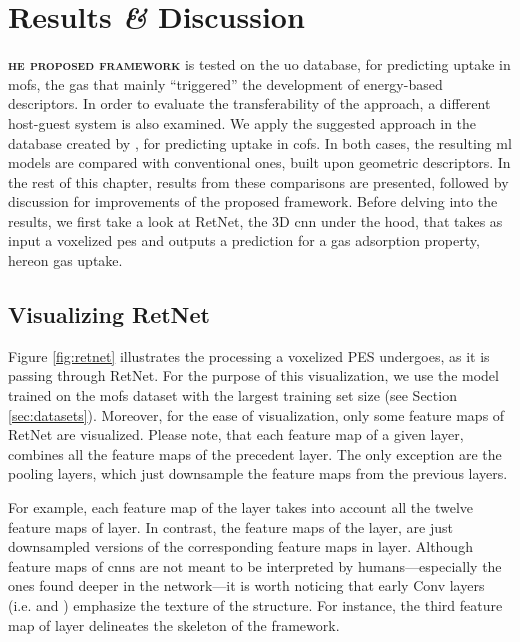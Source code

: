 \chapter{Results \textit{\&} Discussion}

\lettrine[
	nindent=0em, findent=0.5em, loversize=-0.12, lines=5
]{}{\bfseries\color{Blue}he proposed framework} is tested on the
\gls{uo} database, for predicting  uptake in \glspl{mof}, the
gas that mainly ``triggered'' the development of energy-based
descriptors. In order to evaluate the
transferability of the approach, a different host-guest system is also examined.
We apply the suggested approach in the database created by
\textcite{Mercado_2018}, for predicting  uptake in \glspl{cof}. In both
cases, the resulting \gls{ml} models are compared with conventional ones, built
upon geometric descriptors. In the rest of this
chapter, results from these comparisons are presented, followed by discussion
for improvements of the proposed framework. Before delving into the results, we
first take a look at RetNet, the 3D \gls{cnn} under the hood, that
takes as input a voxelized \gls{pes} and outputs a
prediction for a gas adsorption property, hereon gas
uptake.

\section{Visualizing RetNet}

Figure \ref{fig:retnet} illustrates the processing a voxelized PES undergoes, as
it is passing through RetNet. For the purpose of this visualization, we use the
model trained on the \glspl{mof} dataset with the largest training set size (see
Section \ref{sec:datasets}). Moreover, for the ease of visualization, only some
feature maps of RetNet are visualized. Please note, that each feature
map of a given layer, combines all the feature maps of the
precedent layer. The only exception are the pooling layers,
which just downsample the feature maps from the previous
layers.

For example, each feature map of the  layer takes into account all
the twelve feature maps of  layer. In contrast, the feature maps of the
 layer, are just downsampled versions of the corresponding feature maps
in  layer. Although feature maps of \glspl{cnn} are not meant to be
interpreted by humans---especially the ones found deeper in the network---it is
worth noticing that early Conv layers (i.e.  and ) emphasize the
texture of the structure. For instance, the third feature map of  layer
delineates the skeleton of the framework.

